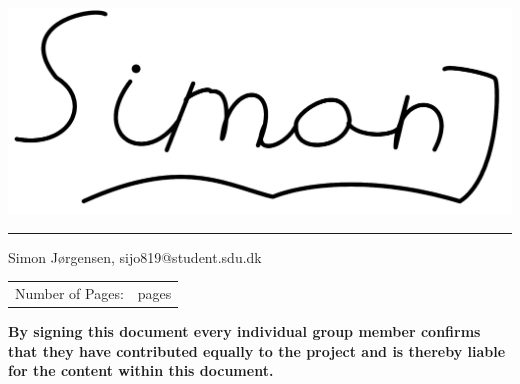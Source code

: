 \noindent
\includegraphics[scale=0.042]{figures/signatures/signatureSJ.png}
\vspace{-3.5mm}
\par\noindent\rule{\textwidth}{0.4pt}
\noindent
Simon Jørgensen, sijo819@student.sdu.dk\\



\noindent
\begin{tabular}{@{}l l}
Number of Pages:    & \pageref{LastPage} pages \\
\end{tabular}

\vspace{3.5mm}

\begin{footnotesize}
\noindent
\textbf{By signing this document every individual group member confirms that they have contributed equally to the project and is thereby liable for the content within this document. }
\end{footnotesize}